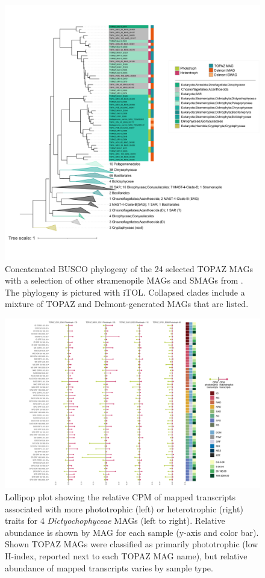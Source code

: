 \documentclass[12pt]{article}
\numberwithin{equation}{section}
\begin{document}
\begin{figure}
    \centering
    \includegraphics[width=0.9\columnwidth]{si-figures/SI-horizontal-collapsed-clades-05062021.png}
    \caption{Concatenated BUSCO phylogeny of the 24 selected TOPAZ MAGs with a selection of other stramenopile MAGs and SMAGs from \citet{Delmont_2020}. The phylogeny is pictured with iTOL. Collapsed clades include a mixture of TOPAZ and Delmont-generated MAGs that are listed.}
    \label{fig:dictyocho-SAR-tree-itol}
\end{figure}

\begin{landscape}
\begin{figure}
    \centering
    \includegraphics[width=0.9\columnwidth]{si-figures/SI-phototrophs-lolli-05062021.png}
    \caption{Lollipop plot showing the relative CPM of mapped transcripts associated with more phototrophic (left) or heterotrophic (right) traits for 4 \textit{Dictyochophyceae} MAGs (left to right). Relative abundance is shown by MAG for each sample (y-axis and color bar). Shown TOPAZ MAGs were classified as primarily phototrophic (low H-index, reported next to each TOPAZ MAG name), but relative abundance of mapped transcripts varies by sample type.}
    \label{fig:dictyocho-SAR-pho-lolli}
\end{figure}
\end{landscape}
\end{document}
